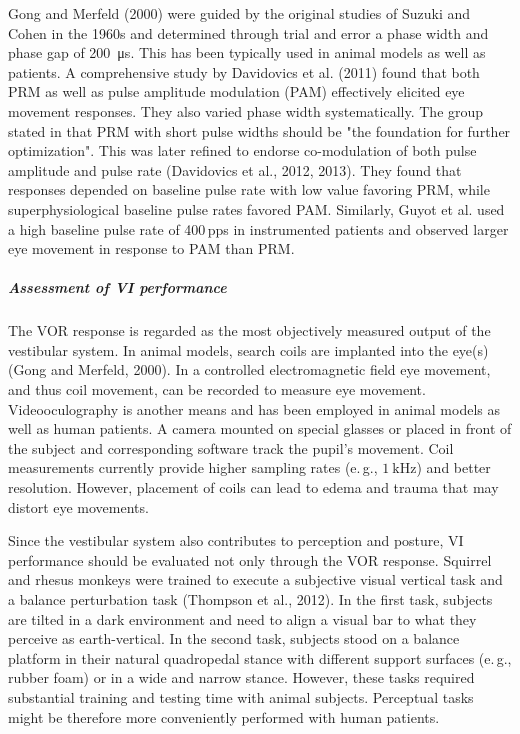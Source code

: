 Gong and Merfeld (2000) were guided by the original studies of Suzuki and Cohen in the 1960s and determined through trial and error a phase width and phase gap of \SI{200}{\micro\second}. This has been typically used in animal models as well as patients. A comprehensive study by Davidovics et al. (2011) found that both PRM as well as pulse amplitude modulation (PAM) effectively elicited eye movement responses. They also varied phase width systematically. The group stated in that PRM with short pulse widths should be "the foundation for further optimization". This was later refined to endorse co-modulation of both pulse amplitude and pulse rate (Davidovics et al., 2012, 2013). They found that responses depended on baseline pulse rate with low value favoring PRM, while superphysiological baseline pulse rates favored PAM. Similarly, Guyot et al. used a high baseline pulse rate of 400\,pps in instrumented patients and observed larger eye movement in response to PAM than PRM.

\subparagraph{Assessment of VI performance}
The VOR response is regarded as the most objectively measured output of the vestibular system. In animal models, search coils are implanted into the eye(s) (Gong and Merfeld, 2000). In a controlled electromagnetic field eye movement, and thus coil movement, can be recorded to measure eye movement. Videooculography is another means and has been employed in animal models as well as human patients. A camera mounted on special glasses or placed in front of the subject and corresponding software track the pupil's movement. Coil measurements currently provide higher sampling rates (e.\,g., $\SI{1}{\kilo\hertz}$) and better resolution. However, placement of coils can lead to edema and trauma that may distort eye movements.

Since the vestibular system also contributes to perception and posture, VI performance should be evaluated not only through the VOR response. Squirrel and rhesus monkeys were trained to execute a subjective visual vertical task and a balance perturbation task (Thompson et al., 2012). In the first task, subjects are tilted in a dark environment and need to align a visual bar to what they perceive as earth-vertical. In the second task, subjects stood on a balance platform in their natural quadropedal stance with different support surfaces (e.\,g., rubber foam) or in a wide and narrow stance. However, these tasks required substantial training and testing time with animal subjects. Perceptual tasks might be therefore more conveniently performed with human patients.

